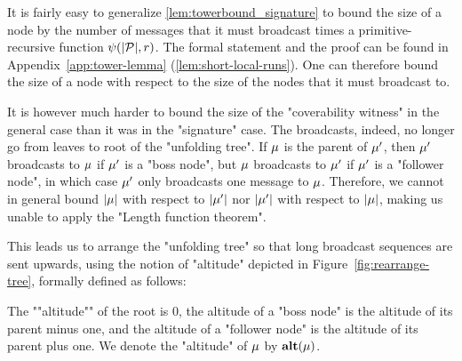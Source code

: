 It is fairly easy to generalize \cref{lem:towerbound_signature} to bound the size of a node by the number of messages that it must broadcast times a primitive-recursive function $\psi(|\mathcal{P}|,r)$. The formal statement and the proof can be found in Appendix~\ref{app:tower-lemma} (\cref{lem:short-local-runs}). 
One can therefore bound the size of a node with respect to the size of the nodes that it must broadcast to.

It is however much harder to bound the size of the "coverability witness" in the general case than it was in the "signature" case. The broadcasts, indeed, no longer go from leaves to root of the "unfolding tree". If $\mu$ is the parent of $\mu'$, then $\mu'$ broadcasts to $\mu$ if $\mu'$ is a "boss node", but $\mu$ broadcasts to $\mu'$ if $\mu'$ is a "follower node", in which case $\mu'$ only broadcasts one message to $\mu$. Therefore, we cannot in general bound $|\mu|$ with respect to $|\mu'|$ nor $|\mu'|$ with respect to $|\mu|$, making us unable to apply the "Length function theorem". 

This leads us to arrange the "unfolding tree" so that long broadcast sequences are sent upwards, using the notion of "altitude" depicted in Figure~\ref{fig:rearrange-tree}, formally defined as follows:

The ""altitude"" of the root is $0$, the altitude of a "boss node" is the altitude of its parent minus one, and the altitude of a "follower node" is the altitude of its parent plus one.
We denote the "altitude" of $\mu$ by $\mathbf{alt}(\mu)$.




